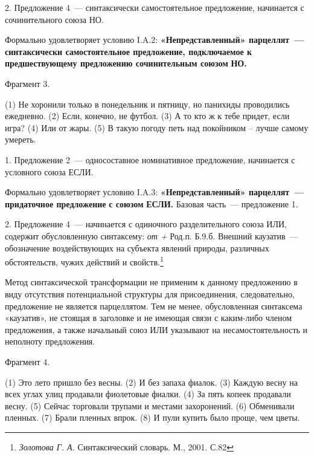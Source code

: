 \documentclass{kursa4}
\begin{document}
{{      {2. Предложение 4~--- синтаксически
      самостоятельное предложение, начинается с сочинительного союза НО.}



      {Формально удовлетворяет условию I.A.2:
      }\textbf{{«Непредставленный»
      п}}\textbf{{арцеллят~--- синтаксически самостоятельное
      предложение, подключаемое к предшествующему предложению сочинительным
      союз}}\textbf{{ом}}\textbf{\textit{{
      }}}\textbf{{НО.}}


      \bigskip

      {Фрагмент 3.}

      {(1) Не хоронили только в понедельник и пятницу, но
      панихиды проводились ежедневно. (2) Если, конечно, не футбол. (3) А то
      кто ж к тебе придет, если игра? (4) Или от жары. (5)
      }{В такую погоду петь над покойником –
      лучше самому умереть.}

      {1. Предложение 2~--- односоставное номинативное
      предложение, начинается с условного союза ЕСЛИ.}

      {Формально удовлетворяет условию I.A.3:
      }\textbf{{«Непредставленный» парцеллят~--- придаточное
      предложение }}\textbf{{с союзом
      }}\textbf{{ЕСЛИ}}\textbf{{.
      }}{Базовая часть~--- предложение 1. }

      {2. Предложение 4~--- начинается с одиночного
      разделительного союза ИЛИ, содержит обусловленную синтаксему:
      }\textit{{от + }}{Род.п. Б.9.б.
      Внешний каузатив~--- обозначение воздействующих на субъекта явлений
      природы, различных обстоятельств, чужих действий и
      свойств.}\footnote{\textit{{ Золотова Г. А.
      }}{Синтаксический словарь. М., 2001.
      С.82}}{ }

      {Метод синтаксической трансформации не применим к
      данному предложению в виду отсутствия потенциальной структуры для
      присоединения, следовательно, предложение не является парцеллятом. Тем
      не менее, обусловленная синтаксема «каузатив», не стоящая в заголовке и
      не имеющая связи с каким-либо членом предложения, а также начальный
      союз ИЛИ указывают на несамостоятельность и неполноту предложения. }

      {Фрагмент 4.}

      {(1) Это лето пришло без весны. (2) И без запаха
      фиалок. (3) Каждую весну на всех углах улиц продавали фиолетовые
      фиалки. (4) За пять копеек продавали весну. (5) Сейчас торговали
      трупами и местами захоронений. (6) Обменивали
      }{пленных. (7) Брали пленных впрок. (8) И пули купить
      было проще, чем цветы.}

}}
\end{document}

